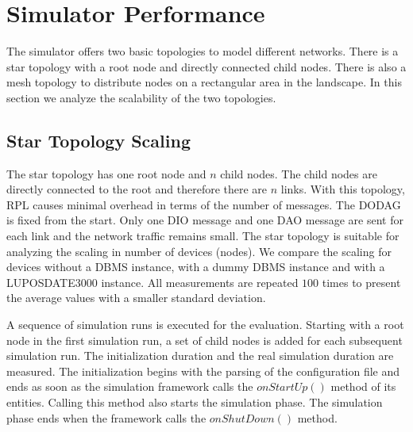 \documentclass[english,version-2019-11]{uzl-thesis}
\begin{document}
\section{Simulator Performance}
The simulator offers two basic topologies to model different networks. There is a star topology with a root node and directly connected child nodes. There is also a mesh topology to distribute nodes on a rectangular area in the landscape. In this section we analyze the scalability of the two topologies.

\subsection{Star Topology Scaling}
The star topology has one root node and $n$ child nodes. The child nodes are directly connected to the root and therefore there are $n$ links. With this topology, RPL causes minimal overhead in terms of the number of messages. The DODAG is fixed from the start. Only one DIO message and one DAO message are sent for each link and the network traffic remains small. The star topology is suitable for analyzing the scaling in number of devices (nodes). We compare the scaling for devices without a DBMS instance, with a dummy DBMS instance and with a LUPOSDATE3000 instance. All measurements are repeated $100$ times to present the average values with a smaller standard deviation.

A sequence of simulation runs is executed for the evaluation.
Starting with a root node in the first simulation run, a set of child nodes is added for each subsequent simulation run. The initialization duration and the real simulation duration are measured. The initialization begins with the parsing of the configuration file and ends as soon as the simulation framework calls the $onStartUp()$ method of its entities. Calling this method also starts the simulation phase. The simulation phase ends when the framework calls the $onShutDown()$ method.
\end{document}
